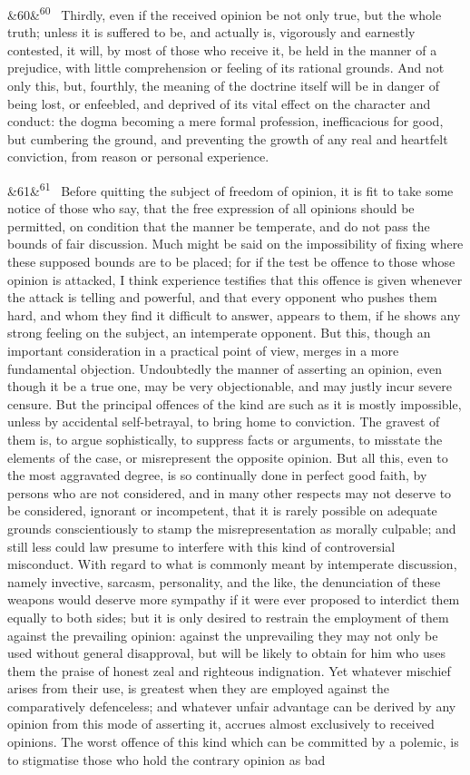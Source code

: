 \documentclass[12pt]{article}
\newcommand{\para}[1][]{\par\noindent\ifx&#1&\else\textsuperscript{\footnotesize #1}~\fi}
\begin{document}
\para[60] Thirdly, even if the received opinion be not only true, but the whole truth; unless it is suffered to be, and actually is, vigorously and earnestly contested, it will, by most of those who receive it, be held in the manner of a prejudice, with little comprehension or feeling of its rational grounds. And not only this, but, fourthly, the meaning of the doctrine itself will be in danger of being lost, or enfeebled, and deprived of its vital effect on the character and conduct: the dogma becoming a mere formal profession, inefficacious for good, but cumbering the ground, and preventing the growth of any real and heartfelt conviction, from reason or personal experience.

\para[61] Before quitting the subject of freedom of opinion, it is fit to take some notice of those who say, that the free expression of all opinions should be permitted, on condition that the manner be temperate, and do not pass the bounds of fair discussion. Much might be said on the impossibility of fixing where these supposed bounds are to be placed; for if the test be offence to those whose opinion is attacked, I think experience testifies that this offence is given whenever the attack is telling and powerful, and that every opponent who pushes them hard, and whom they find it difficult to answer, appears to them, if he shows any strong feeling on the subject, an intemperate opponent. But this, though an important consideration in a practical point of view, merges in a more fundamental objection. Undoubtedly the manner of asserting an opinion, even though it be a true one, may be very objectionable, and may justly incur severe censure. But the principal offences of the kind are such as it is mostly impossible, unless by accidental self-betrayal, to bring home to conviction. The gravest of them is, to argue sophistically, to suppress facts or arguments, to misstate the elements of the case, or misrepresent the opposite opinion. But all this, even to the most aggravated degree, is so continually done in perfect good faith, by persons who are not considered, and in many other respects may not deserve to be considered, ignorant or incompetent, that it is rarely possible on adequate grounds conscientiously to stamp the misrepresentation as morally culpable; and still less could law presume to interfere with this kind of controversial misconduct. With regard to what is commonly meant by intemperate discussion, namely invective, sarcasm, personality, and the like, the denunciation of these weapons would deserve more sympathy if it were ever proposed to interdict them equally to both sides; but it is only desired to restrain the employment of them against the prevailing opinion: against the unprevailing they may not only be used without general disapproval, but will be likely to obtain for him who uses them the praise of honest zeal and righteous indignation. Yet whatever mischief arises from their use, is greatest when they are employed against the comparatively defenceless; and whatever unfair advantage can be derived by any opinion from this mode of asserting it, accrues almost exclusively to received opinions. The worst offence of this kind which can be committed by a polemic, is to stigmatise those who hold the contrary opinion as bad 
\end{document}
